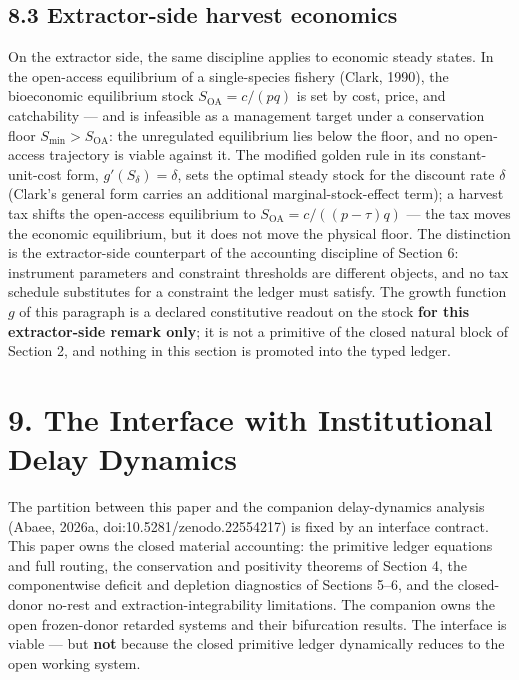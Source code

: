 \documentclass[11pt]{article}
\begin{document}
\subsection*{8.3 Extractor-side harvest economics}\label{83-extractor-side-harvest-economics}

On the extractor side, the same discipline applies to economic steady states. In the open-access equilibrium of a single-species fishery (Clark, 1990), the bioeconomic equilibrium stock \(S_{\mathrm{OA}} = c/(pq)\) is set by cost, price, and catchability --- and is infeasible as a management target under a conservation floor \(S_{\min} > S_{\mathrm{OA}}\): the unregulated equilibrium lies below the floor, and no open-access trajectory is viable against it. The modified golden rule in its constant-unit-cost form, \(g'(S_\delta) = \delta\), sets the optimal steady stock for the discount rate \(\delta\) (Clark's general form carries an additional marginal-stock-effect term); a harvest tax shifts the open-access equilibrium to \(S_{\mathrm{OA}} =\allowbreak{} c/((p - \tau)q)\) --- the tax moves the economic equilibrium, but it does not move the physical floor. The distinction is the extractor-side counterpart of the accounting discipline of Section 6: instrument parameters and constraint thresholds are different objects, and no tax schedule substitutes for a constraint the ledger must satisfy. The growth function \(g\) of this paragraph is a declared constitutive readout on the stock \textbf{for this extractor-side remark only}; it is not a primitive of the closed natural block of Section 2, and nothing in this section is promoted into the typed ledger.

\vspace{0.8em}

\section*{9. The Interface with Institutional Delay Dynamics}\label{9-the-interface-with-institutional-delay-dynamics}

The partition between this paper and the companion delay-dynamics analysis (Abaee, 2026a, doi:10.5281/\allowbreak{}zenodo.22554217) is fixed by an interface contract. This paper owns the closed material accounting: the primitive ledger equations and full routing, the conservation and positivity theorems of Section 4, the componentwise deficit and depletion diagnostics of Sections 5--6, and the closed-donor no-rest and extraction-integrability limitations. The companion owns the open frozen-donor retarded systems and their bifurcation results. The interface is viable --- but \textbf{not} because the closed primitive ledger dynamically reduces to the open working system.
\end{document}
